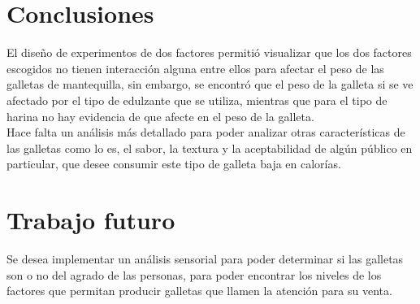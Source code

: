 \documentclass[spanish,letterpaper,12pt]{article}
\begin{document}
%
\section{Conclusiones}
\label{conclusiones}

El diseño de experimentos de dos factores permitió visualizar que los dos factores escogidos no tienen interacción alguna entre ellos para afectar el peso de las galletas de mantequilla, sin embargo, se encontró que el peso de la galleta si se ve afectado por el tipo de edulzante que se utiliza, mientras que para el tipo de harina no hay evidencia de que afecte en el peso de la galleta.\\

Hace falta un análisis más detallado para poder analizar otras características de las galletas como lo es, el sabor, la textura y la aceptabilidad de algún público en particular, que desee consumir este tipo de galleta baja en calorías.

\section{Trabajo futuro}

Se desea implementar un análisis sensorial para poder determinar si las galletas son o no del agrado de las personas, para poder encontrar los niveles de los factores que permitan producir galletas que llamen la atención para su venta.

%
%
%


\end{document}
